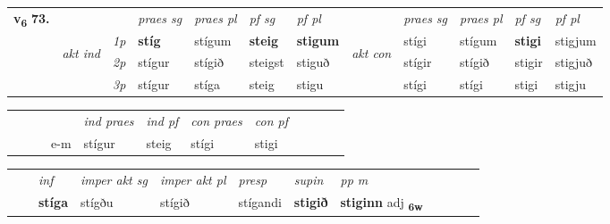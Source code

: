 \begin{tabular}{llllllllllll} \toprule
\multirow{4}{*}{{{\textbf{v{\textsubscript{6}}} \Large{\textbf{73.}}}}}  & &   &  \textit{praes sg}  & \textit{praes pl}  &\textit{ pf sg} & \textit{pf pl} &  &  \textit{praes sg}  & \textit{praes pl}  & \textit{pf sg} & \textit{pf pl } \\*
	\cmidrule{4-7} \cmidrule{9-12}
 & \multirow{3}{*}{\begin{turn}{90}\textit{akt ind}\end{turn}} & {\textit{1p}} & \textbf{stíg} & stígum    & \textbf{steig} & \textbf{stigum} & \multirow{3}{*}{\begin{turn}{90}\textit{akt con}\end{turn}} &stígi & stígum & \textbf{stigi} & stigjum\\*
& &  {\textit{2p}} &  stígur  & stígið   & steigst & stiguð & & stígir & stígið & stigir & stigjuð \\*
& &  {\textit{3p}} & stígur & stíga   & steig & stigu & & stígi & stígi& stigi & stigju  \\*
\cmidrule{4-7} \cmidrule{9-12}
\end{tabular}


\begin{tabular}{llllllllllll}
 & &  & &  \textit{ind praes} & \textit{ind pf} & \textit{con praes} & \textit{con pf} \\*
&  & & e-m & stígur & steig & stígi & stigi \\*
\cmidrule{5-9}
\end{tabular}


\begin{tabular}{llllllllllll}
 & & \textit{inf} & \textit{imper akt sg} & \textit{imper akt pl}   & \textit{presp} & \textit{supin}  & \textit{pp m}     \\*
  & & \textbf{stíga} & stígðu  & stígið   & stígandi &  \textbf{stigið}  & \textbf{stiginn} adj \textbf{\textsubscript{6w}} \\*
\cmidrule{1-12}
\end{tabular}



